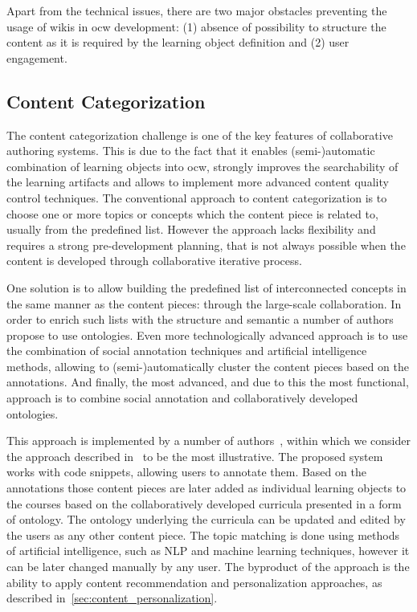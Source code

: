 \documentclass[PhD, Submit, ngerman,UKenglish,table]{scrbook}
\begin{document}
Apart from the technical issues, there are two major obstacles preventing the usage of wikis in \gls{ocw} development: (1) absence of possibility to structure the content as it is required by the learning object definition and (2) user engagement.


\subsection{Content Categorization}

The content categorization challenge is one of the key features of collaborative authoring systems.
This is due to the fact that it enables (semi-)automatic combination of learning objects into \gls{ocw}, strongly improves the searchability of the learning artifacts and allows to implement more advanced content quality control techniques.
The conventional approach to content categorization is to choose one or more topics or concepts which the content piece is related to, usually from the predefined list.
However the approach lacks flexibility and requires a strong pre-development planning, that is not always possible when the content is developed through collaborative iterative process.

One solution is to allow building the predefined list of interconnected concepts in the same manner as the content pieces: through the large-scale collaboration.
In order to enrich such lists with the structure and semantic a number of authors propose to use ontologies.
Even more technologically advanced approach is to use the combination of social annotation techniques and artificial intelligence methods, allowing to (semi-)automatically cluster the content pieces based on the annotations.
And finally, the most advanced, and due to this the most functional, approach is to combine social annotation and collaboratively developed ontologies. 

This approach is implemented by a number of authors~\cite{Zhang2007, Agnew2010, Lee2010, Moro2011, Ghali2009, Achananuparp2007}, within which we consider the approach described in~\cite{Zhang2007} to be the most illustrative.
The proposed system works with code snippets, allowing users to annotate them.
Based on the annotations those content pieces are later added as individual learning objects to the courses based on the collaboratively developed curricula presented in a form of ontology.
The ontology underlying the curricula can be updated and edited by the users as any other content piece. 
The topic matching is done using methods of artificial intelligence, such as NLP and machine learning techniques, however it can be later changed manually by any user.
The byproduct of the approach is the ability to apply content recommendation and personalization approaches, as described in~\autoref{sec:content_personalization}.
\end{document}
